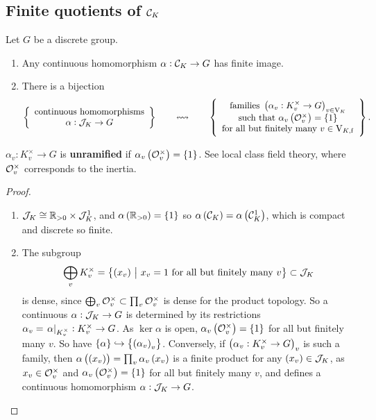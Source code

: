 \subsection{Finite quotients of \texorpdfstring{$ \mathcal{C}_K $}{idele class group}}

\begin{proposition}
\label{prop:8.1}
Let $ G $ be a discrete group.
\begin{enumerate}
\item Any continuous homomorphism $ \alpha : \mathcal{C}_K \to G $ has finite image.
\item There is a bijection
$$ \correspondence{\text{continuous homomorphisms} \\ \alpha : \JJJ_K \to G}{\text{families} \ \br{\alpha_v : K_v^\times \to G}_{v \in \V_K} \\ \text{such that} \ \alpha_v\br{\OOO_v^\times} = \cbr{1} \\ \text{for all but finitely many} \ v \in \V_{K, \f}}. $$
\end{enumerate}
\end{proposition}

\begin{notation*}
$ \alpha_v : K_v^\times \to G $ is \textbf{unramified} if $ \alpha_v\br{\OOO_v^\times} = \cbr{1} $. See local class field theory, where $ \mathcal{O}_v^\times $ corresponds to the inertia.
\end{notation*}

\begin{proof}
\hfill
\begin{enumerate}
\item $ \mathcal{J}_K \cong \mathbb{R}_{> 0} \times \mathcal{J}_K^1 $, and $ \alpha\br{\RR_{> 0}} = \cbr{1} $ so $ \alpha\br{\CCC_K} = \alpha\br{\CCC_K^1} $, which is compact and discrete so finite.
\item The subgroup
$$ \bigoplus_v K_v^\times = \cbr{\br{x_v} \st x_v = 1 \ \text{for all but finitely many} \ v} \subset \JJJ_K $$
is dense, since $ \bigoplus_v \mathcal{O}_v^\times \subset \prod_v \mathcal{O}_v^\times $ is dense for the product topology. So a continuous $ \alpha : \mathcal{J}_K \to G $ is determined by its restrictions $ \alpha_v = \left. \alpha \right|_{K_v^\times} : K_v^\times \to G $. As $ \ker \alpha $ is open, $ \alpha_v\br{\OOO_v^\times} = \cbr{1} $ for all but finitely many $ v $. So have $ \cbr{\alpha} \hookrightarrow \cbr{\br{\alpha_v}_v} $. Conversely, if $ \br{\alpha_v : K_v^\times \to G}_v $ is such a family, then $ \alpha\br{\br{x_v}} = \prod_v \alpha_v\br{x_v} $ is a finite product for any $ \br{x_v} \in \JJJ_K $, as $ x_v \in \mathcal{O}_v^\times $ and $ \alpha_v\br{\OOO_v^\times} = \cbr{1} $ for all but finitely many $ v $, and defines a continuous homomorphism $ \alpha : \mathcal{J}_K \to G $.
\end{enumerate}
\end{proof}


